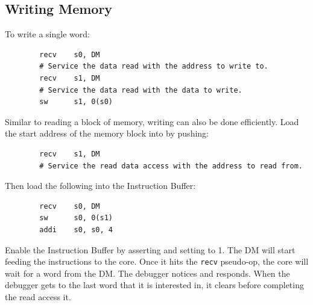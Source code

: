 \documentclass{article}
\begin{document}
\begin{table}[htp]
\begin{tabulary}{\textwidth}{|r|l|L|}
        \hline
    \end{tabulary}
\end{table}

\subsection{Writing Memory} \label{writemem}

To write a single word:
\begin{verbatim}
        recv    s0, DM
        # Service the data read with the address to write to.
        recv    s1, DM
        # Service the data read with the data to write.
        sw      s1, 0(s0)
\end{verbatim}

Similar to reading a block of memory, writing can also be done efficiently.
Load the start address of the memory block into \Sone by pushing:
\begin{verbatim}
        recv    s1, DM
        # Service the read data access with the address to read from.
\end{verbatim}

Then load the following into the Instruction Buffer:
\begin{verbatim}
        recv    s0, DM
        sw      s0, 0(s1)
        addi    s0, s0, 4
\end{verbatim}

Enable the Instruction Buffer by asserting \Fibufenable and setting
\Fibufaction to 1. The DM will start feeding the instructions to the core. Once
it hits the {\tt recv} pseudo-op, the core will wait for a word from the DM.
The debugger notices and responds.  When the debugger gets to the last word
that it is interested in, it clears \Fibufenable before completing the read
access it.
\end{document}
